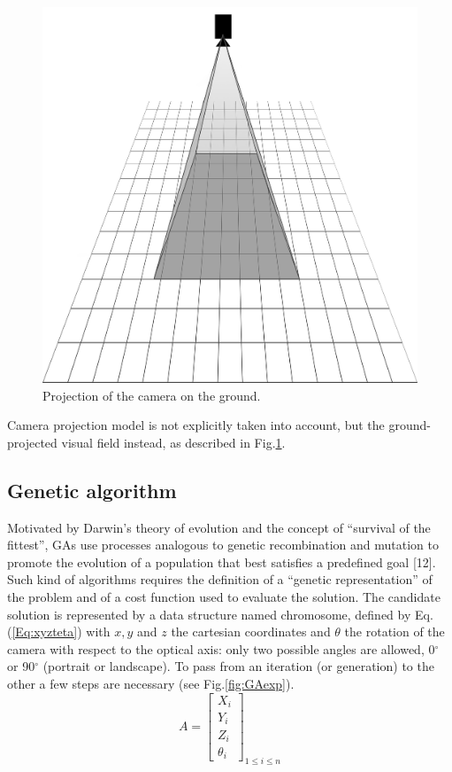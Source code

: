 \begin{figure}[!htb]
  \includegraphics[width=\linewidth]{figures/Camera.jpg}
  \caption{Projection of the camera on the ground.}\label{fig:cam_proj}
  \endminipage\hfill
\end{figure}

Camera projection model is not explicitly taken into account, but the ground-projected visual field instead, as described in Fig.\ref{fig:cam_proj}.

\subsection{Genetic algorithm }
Motivated by Darwin's theory of evolution and the concept of “survival of the fittest”, GAs use processes analogous to genetic recombination and mutation to promote the evolution of a population that best satisfies a predefined goal [12]. Such kind of algorithms requires the definition of a “genetic representation” of the problem and of a cost function used to evaluate the solution. The candidate solution is represented by a data structure named chromosome, defined by Eq.(\ref{Eq:xyzteta}) with $x,y$ and $z$ the cartesian coordinates and $\theta$ the rotation of the camera with respect to the optical axis: only  two possible angles are allowed, 0$^{\circ}$  or 90$^{\circ}$ (portrait or landscape). To pass from an iteration (or generation) to the other a few steps are necessary (see Fig.\ref{fig:GAexp}).
\begin{equation}\label{Eq:xyzteta}
     A=\begin{bmatrix}
         X_{i} \\
         Y_{i} \\
         Z_{i}\\
         \theta_{i}
        \end{bmatrix}_{1 \leq i \leq n}
  \end{equation}


